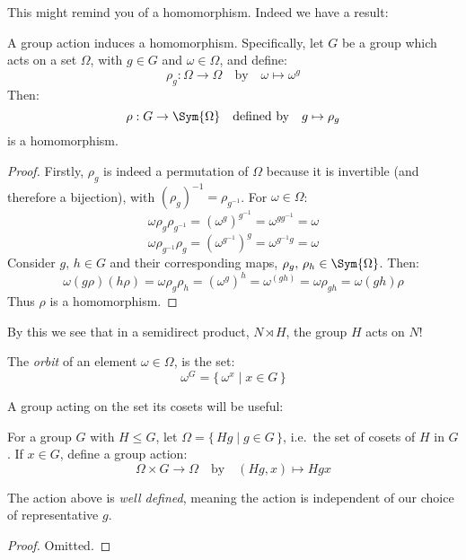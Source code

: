 This might remind you of a homomorphism.
Indeed we have a result:

\begin{lemma}\label{lem:actionhom}
    \raggedright
    A group action induces a homomorphism.
    Specifically, let \(G\) be a group which acts on a set \(\Omega\), with \(g \in G\) and \(\omega \in \Omega\), and
    define:
    \[\rho_g:\Omega \to \Omega \quad \text{by} \quad \omega \mapsto \omega^g\]
    Then:
    \[\rho:G \to \Sym{\Omega} \quad \text{defined by} \quad g \mapsto \rho_g\]
    is a homomorphism.
\end{lemma}

\begin{proof}
    Firstly, \(\rho_g\) is indeed a permutation of \(\Omega\) because it is invertible (and therefore a bijection),
    with \({(\rho_g)}^{-1} = \rho_{g^{-1}}\).
    For \(\omega \in \Omega\):
    \[ \omega \rho_g \rho_{g^{-1}} = {(\omega^g)}^{g^{-1}} = \omega^{gg^{-1}} = \omega \]
    \[ \omega \rho_{g^{-1}} \rho_g = {(\omega^{g^{-1}})}^g = \omega^{g^{-1}g} = \omega \]
    Consider \(g,\,h \in G\) and their corresponding maps, \(\rho_{g},\,\rho_{h} \in \Sym{\Omega}\).
    Then:
    \[\omega(g\rho)(h\rho) = \omega\rho_g\rho_h = {(\omega^g)}^h = \omega^{(gh)} = \omega\rho_{gh} = \omega(gh)\rho\]
    Thus \(\rho\) is a homomorphism.
\end{proof}

By this we see that in a semidirect product, \(N \rtimes H\), the group \(H\) acts on \(N\)!

\begin{definition}
    \raggedright
    The \emph{orbit} of an element \(\omega \in \Omega\), is the set:
    \[\omega^G = \{\,\omega^x \mid x \in G\,\}\]
\end{definition}

A group acting on the set its cosets will be useful:

\begin{definition}
    \raggedright
    For a group \(G\) with \(H \leqslant G\), let \(\Omega = \{\,Hg \mid g \in G\,\}\), i.e.\ the set of cosets of \(H\)
    in \(G\).
    If \(x \in G\), define a group action:
    \[\Omega \times G \to \Omega \quad \text{by} \quad (Hg, x) \mapsto Hgx\]
\end{definition}

\begin{lemma}
    \raggedright
    The action above is \emph{well defined}, meaning the action is independent of our choice of representative \(g\).
\end{lemma}

\begin{proof}
    Omitted.
\end{proof}

